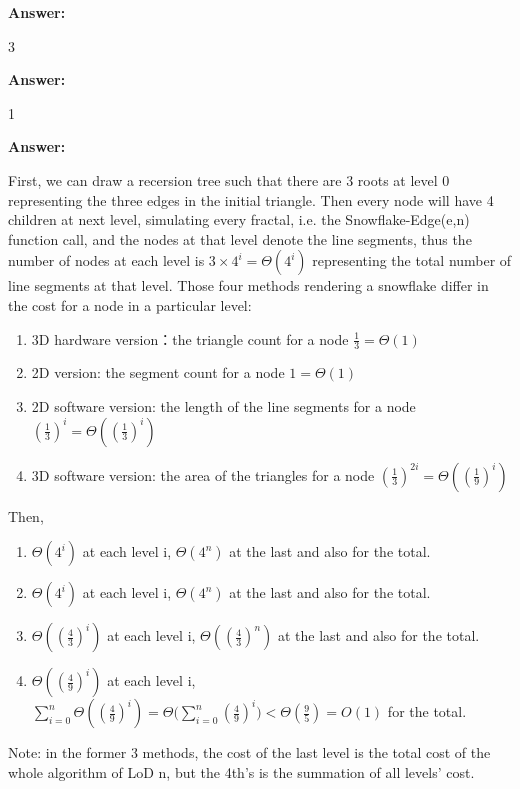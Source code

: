 \documentclass[12pt,twoside]{article}
\newcommand{\answer}{
 \par\medskip
 \textbf{Answer:}
}
\newcommand{\answerIs}{ \answer
3
}
\newcommand{\answerIt}{ \answer
1
}
\newcommand{\answerIu}{ \answer
First, we can draw a recersion tree such that there are 3 roots at level 0 representing the three edges in the initial triangle. Then every node will have 4 children at next level, simulating every fractal, i.e. the Snowflake-Edge(e,n) function call, and the nodes at that level denote the line segments, thus the number of nodes at each level is $ 3 \times 4^i =\Theta(4^i)$ representing the total number of line segments at that level. Those four methods rendering a snowflake differ in the cost for a node in a particular level:
\begin{enumerate}
	\item 3D hardware version：the triangle count for a node 
	$ \frac{1}{3}=\Theta(1) $
	\item 2D version: the segment count for a node 
	$ 1 =\Theta(1)$
	\item 2D software version: the length of the line segments for a node 
	$ (\frac{1}{3})^i=\Theta((\frac{1}{3})^i) $
	\item 3D software version: the area of the triangles for a node
	$ (\frac{1}{3})^{2i}=\Theta((\frac{1}{9})^i)  $
\end{enumerate}

Then, 
\begin{enumerate}
	\item $ \Theta(4^i) $ at each level i, $ \Theta(4^n) $ at the last and also for the total.
	\item $ \Theta(4^i) $ at each level i, $ \Theta(4^n) $ at the last and also for the total.
	\item $ \Theta((\frac{4}{3})^i) $ at each level i, $ \Theta((\frac{4}{3})^n) $ at the last and also for the total.
	\item $ \Theta((\frac{4}{9})^i) $ at each level i, $ \sum_{i=0}^n{\Theta((\frac{4}{9})^i)} =\Theta(\sum_{i=0}^n{(\frac{4}{9})^i)}
	< \Theta(\frac{9}{5})= O(1) $ for the total.
\end{enumerate}
Note: in the former 3 methods, the cost of the last level is the total cost of the whole algorithm of LoD n, but the 4th's is the summation of all levels' cost.

}
\begin{document}
\begin{problems}
\begin{problemparts}
\begin{problemparts}
\answerIs

\end{problemparts}


\begin{problemparts}
\answerIt
    
  \answerIu
\end{problemparts}

\end{problemparts}



\end{problems}
\end{document}
